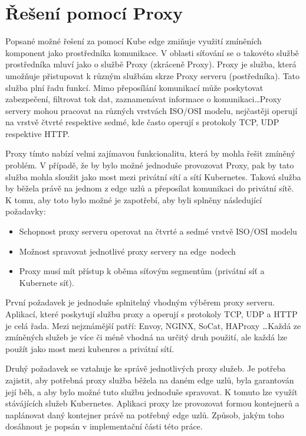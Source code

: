 \section{Řešení pomocí Proxy}\label{sec:req}
Popsané možné řešení za pomocí Kube edge zmiňuje využití zmíněních komponent jako prostředníka komunikace. V oblasti síťování se o takovéto službě prostředníka mluví jako o službě Proxy (zkráceně Proxy). Proxy je služba, která umožňuje přistupovat k různým službám skrze Proxy serveru (postředníka). Tato služba plní řadu funkcí. Mimo přeposílání komunikací může poskytovat zabezpečení, filtrovat tok dat, zaznamenávat informace o komunikaci\ldots Proxy servery mohou pracovat na různých vrstvách ISO/OSI modelu, nejčastěji operují na vrstvě čtvrté respektive sedmé, kde často operují s protokoly TCP, UDP respektive HTTP.

Proxy tímto nabízí velmi zajímavou funkcionalitu, která by mohla řešit zmíněný problém. V případě, že by bylo možné jednoduše provozovat Proxy, pak by tato služba mohla sloužit jako most mezi privátní sítí a sítí Kubernetes. Taková služba by běžela právě na jednom z edge uzlů a přeposílat komunikaci do privátní sítě. K tomu, aby toto bylo možné je zapotřebí, aby byli splněny následující požadavky:

\begin{itemize}
    \item Schopnost proxy serveru operovat na čtvrté a sedmé vrstvě ISO/OSI modelu
    \item Možnost spravovat jednotlivé proxy servery na edge~nodech
    \item Proxy musí mít přístup k oběma síťovým segmentům (privátní síť a Kubernete síť).
\end{itemize}

První požadavek je jednoduše splnitelný vhodným výběrem proxy serveru. Aplikací, které poskytují službu proxy a operují s protokoly TCP, UDP a HTTP je celá řada. Mezi nejznámější patří: Envoy, NGINX, SoCat, HAProxy \ldots Každá ze zmíněných služeb je více či méně vhodná na určitý druh použití, ale každá lze použít jako most mezi kubenres a privátní sítí.

Druhý požadavek se vztahuje ke správě jednotlivých proxy služeb. Je potřeba zajistit, aby potřebná proxy služba běžela na daném edge uzlů, byla garantován její běh, a aby bylo možné tuto službu jednoduše spravovat. K tomuto lze využít stávájících služeb Kubernetes. Aplikaci proxy lze provozovat formou kontejnerů a naplánovat daný kontejner právě na potřebný edge uzlů. Způsob, jakým toho dosáhnout je popsán v implementační části této práce.  


